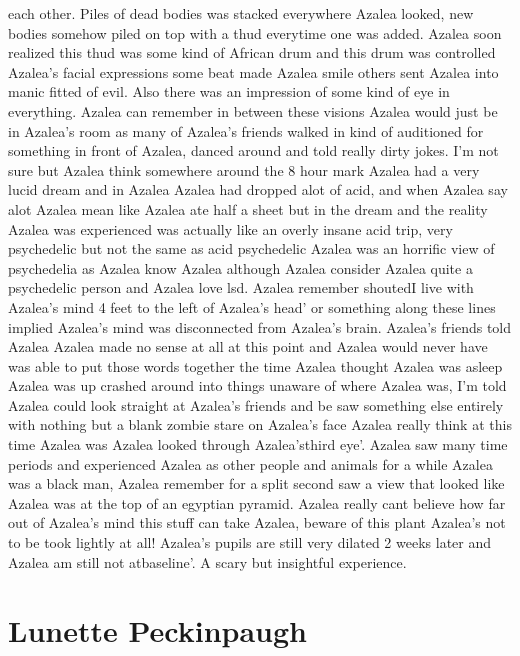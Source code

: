 \documentclass[12pt]{book}
\begin{document}
each other. Piles of dead bodies was stacked everywhere Azalea looked, new bodies somehow piled on top with a thud everytime one was added. Azalea soon realized this thud was some kind of African drum and this drum was controlled Azalea's facial expressions some beat made Azalea smile others sent Azalea into manic fitted of evil. Also there was an impression of some kind of eye in everything. Azalea can remember in between these visions Azalea would just be in Azalea's room as many of Azalea's friends walked in kind of auditioned for something in front of Azalea, danced around and told really dirty jokes. I'm not sure but Azalea think somewhere around the 8 hour mark Azalea had a very lucid dream and in Azalea Azalea had dropped alot of acid, and when Azalea say alot Azalea mean like Azalea ate half a sheet but in the dream and the reality Azalea was experienced was actually like an overly insane acid trip, very psychedelic but not the same as acid psychedelic Azalea was an horrific view of psychedelia as Azalea know Azalea although Azalea consider Azalea quite a psychedelic person and Azalea love lsd. Azalea remember shoutedI live with Azalea's mind 4 feet to the left of Azalea's head' or something along these lines implied Azalea's mind was disconnected from Azalea's brain. Azalea's friends told Azalea Azalea made no sense at all at this point and Azalea would never have was able to put those words together the time Azalea thought Azalea was asleep Azalea was up crashed around into things unaware of where Azalea was, I'm told Azalea could look straight at Azalea's friends and be saw something else entirely with nothing but a blank zombie stare on Azalea's face Azalea really think at this time Azalea was Azalea looked through Azalea'sthird eye'. Azalea saw many time periods and experienced Azalea as other people and animals for a while Azalea was a black man, Azalea remember for a split second saw a view that looked like Azalea was at the top of an egyptian pyramid. Azalea really cant believe how far out of Azalea's mind this stuff can take Azalea, beware of this plant Azalea's not to be took lightly at all! Azalea's pupils are still very dilated 2 weeks later and Azalea am still not atbaseline'. A scary but insightful experience.



\chapter{Lunette Peckinpaugh}
\end{document}
